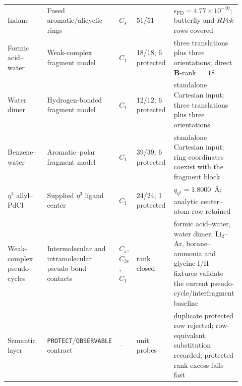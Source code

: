 \documentclass[journal=jctcce,manuscript=article,layout=traditional]{achemso}
\newcommand{\Bmat}{\mathbf{B}}
\theoremstyle{definition}
\begin{document}
\begin{table}[htbp]
\begin{tabular}{@{}p{0.17\linewidth}p{0.25\linewidth}p{0.07\linewidth}p{0.16\linewidth}p{0.27\linewidth}@{}}
Indane & Fused aromatic/alicyclic rings & \(C_s\) & 51/51 & \(\epsilon_\mathrm{FD}=4.77\times10^{-10}\); butterfly and \(RPck\) rows covered \\
Formic acid--water & Weak-complex fragment model & \(C_1\) & 18/18; 6 protected & three translations plus three orientations; direct \(\Bmat\)-rank \(=18\) \\
Water dimer & Hydrogen-bonded fragment model & \(C_1\) & 12/12; 6 protected & standalone Cartesian input; three translations plus three orientations \\
Benzene--water & Aromatic--polar fragment model & \(C_1\) & 39/39; 6 protected & standalone Cartesian input; ring coordinates coexist with the fragment block \\
$\eta^3$ allyl--PdCl & Supplied $\eta^3$ ligand center & \(C_1\) & 24/24; 1 protected & \(q_{\eta^3}=1.8000\)~\AA; analytic center--atom row retained \\
Weak-complex pseudo-cycles & Intermolecular and intramolecular pseudo-bond
contacts & \(C_s\), \(C_{3v}\), \(C_1\) & rank closed & formic acid--water,
water dimer, Li\(_2\)--Ar, borane--ammonia and glycine I/II fixtures validate
the current pseudo-cycle/interfragment baseline \\
Semantic layer & \texttt{PROTECT}/\texttt{OBSERVABLE} contract & -- & unit probes & duplicate protected row rejected; row-equivalent substitution recorded; protected rank excess fails fast \\
\bottomrule
\end{tabular}
\end{table}
\end{document}

